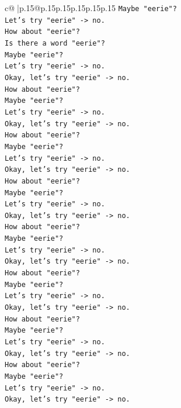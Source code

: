 \documentclass{article}
\begin{document}
{\begin{supertabular}{c@{$\;$}|p{.15\linewidth}@{}p{.15\linewidth}p{.15\linewidth}p{.15\linewidth}p{.15\linewidth}p{.15\linewidth}}
{{{\texttt{Maybe "eerie"?} \\
\texttt{Let's try "eerie" {-}> no.} \\
\texttt{How about "eerie"?} \\
\texttt{Is there a word "eerie"?} \\
\texttt{Maybe "eerie"?} \\
\texttt{Let's try "eerie" {-}> no.} \\
\texttt{Okay, let's try "eerie" {-}> no.} \\
\texttt{How about "eerie"?} \\
\texttt{Maybe "eerie"?} \\
\texttt{Let's try "eerie" {-}> no.} \\
\texttt{Okay, let's try "eerie" {-}> no.} \\
\texttt{How about "eerie"?} \\
\texttt{Maybe "eerie"?} \\
\texttt{Let's try "eerie" {-}> no.} \\
\texttt{Okay, let's try "eerie" {-}> no.} \\
\texttt{How about "eerie"?} \\
\texttt{Maybe "eerie"?} \\
\texttt{Let's try "eerie" {-}> no.} \\
\texttt{Okay, let's try "eerie" {-}> no.} \\
\texttt{How about "eerie"?} \\
\texttt{Maybe "eerie"?} \\
\texttt{Let's try "eerie" {-}> no.} \\
\texttt{Okay, let's try "eerie" {-}> no.} \\
\texttt{How about "eerie"?} \\
\texttt{Maybe "eerie"?} \\
\texttt{Let's try "eerie" {-}> no.} \\
\texttt{Okay, let's try "eerie" {-}> no.} \\
\texttt{How about "eerie"?} \\
\texttt{Maybe "eerie"?} \\
\texttt{Let's try "eerie" {-}> no.} \\
\texttt{Okay, let's try "eerie" {-}> no.} \\
\texttt{How about "eerie"?} \\
\texttt{Maybe "eerie"?} \\
\texttt{Let's try "eerie" {-}> no.} \\
\texttt{Okay, let's try "eerie" {-}> no.} \\
}}}
\end{supertabular}}
\end{document}
